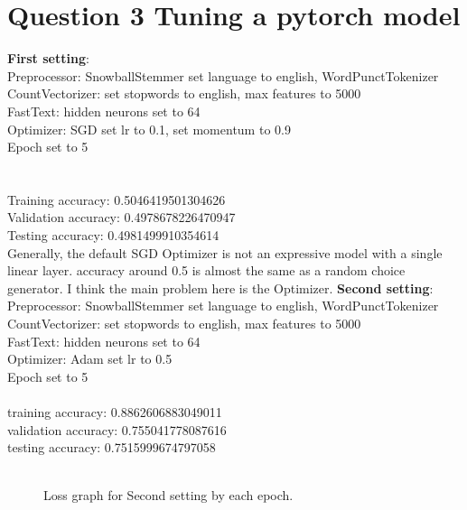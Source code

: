 \documentclass{article} %
\begin{document}
\section*{Question 3 Tuning a pytorch model}
\textbf{First setting}:\\
Preprocessor: SnowballStemmer set language to english, WordPunctTokenizer\\
CountVectorizer: set stopwords to english, max features to 5000\\
FastText: hidden neurons set to 64\\
Optimizer: SGD set lr to 0.1, set momentum to 0.9\\
Epoch set to 5\\
\\\\
\noindent
Training accuracy: 0.5046419501304626\\
Validation accuracy: 0.4978678226470947\\
Testing accuracy: 0.4981499910354614\\

Generally, the default SGD Optimizer is not an expressive model with a single linear layer. accuracy around 0.5 is almost the same as a random choice generator. I think the main problem here is the Optimizer.
\noindent
\textbf{Second setting}:\\
Preprocessor: SnowballStemmer set language to english, WordPunctTokenizer\\
CountVectorizer: set stopwords to english, max features to 5000\\
FastText: hidden neurons set to 64\\
Optimizer: Adam set lr to 0.5\\
Epoch set to 5\\
\\
\noindent
training accuracy: 0.8862606883049011\\
validation accuracy: 0.755041778087616\\
testing accuracy: 0.7515999674797058\\
\begin{figure}[htp]
    \centering
    \\
Loss graph for Second setting by each epoch.   
    \end{figure}
\end{document}
